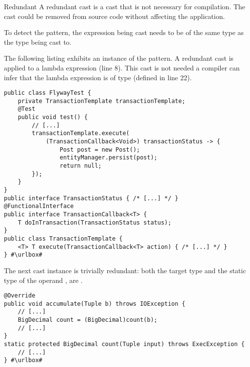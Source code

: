 \begin{pattern}{Redundant}
A redundant cast is a cast that is not necessary for compilation.
The cast could be removed from source code without affecting the application.

To detect the \thisp{} pattern, 
the expression being cast needs to be of the same type as the type being cast to.

\instances{}
The following listing exhibits an instance of the \thisp{} pattern.
A redundant cast is applied to a lambda expression (line 8).
This cast is not needed a \java{} compiler can infer that the lambda expression is of type  (defined in line 22).

\def\urlvar{http://bit.ly/vladmihalcea_high_performance_java_persistence_2FWXw2e}
\begin{verbatim}
public class FlywayTest {
    private TransactionTemplate transactionTemplate;
    @Test
    public void test() {
        // [...]
        transactionTemplate.execute(
            (TransactionCallback<Void>) transactionStatus -> {
                Post post = new Post();
                entityManager.persist(post);
                return null;
        });
    }
}
public interface TransactionStatus { /* [...] */ }
@FunctionalInterface
public interface TransactionCallback<T> {	
	T doInTransaction(TransactionStatus status);
}
public class TransactionTemplate {
	<T> T execute(TransactionCallback<T> action) { /* [...] */ }
} #\urlbox#
\end{verbatim}

The next cast instance is trivially redundant:
both the target type and the static type of the operand ,
are .

\def\urlvar{http://bit.ly/sigmoidanalytics_spork_2SIqWYq}
\begin{verbatim}
@Override
public void accumulate(Tuple b) throws IOException {
    // [...]
    BigDecimal count = (BigDecimal)count(b);
    // [...]
}
static protected BigDecimal count(Tuple input) throws ExecException {
    // [...]
} #\urlbox#
\end{verbatim}


\end{pattern}
